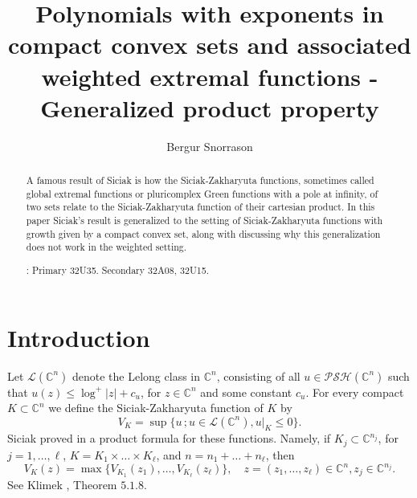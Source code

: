 \documentclass[a4paper,12pt,leqno,english]{article}
\title{{\Large \bf 
Polynomials with exponents in  compact convex sets  and 
associated weighted extremal functions -  \\
Generalized product property}}
\author{Bergur Snorrason}
\date{}
\numberwithin{equation}{section}
\begin{document}
\maketitle

\begin{abstract}
\noindent
A famous result of Siciak is how the Siciak-Zakharyuta functions,
    sometimes called global extremal functions or pluricomplex Green functions with a pole at infinity,
    of two sets relate to the Siciak-Zakharyuta function of their cartesian product.
In this paper Siciak's result is generalized to the setting of Siciak-Zakharyuta functions with growth given by a compact convex set,
    along with discussing why this generalization does not work in the weighted setting.

\medskip\par
{}: Primary 32U35. Secondary 32A08, 32U15.  
\end{abstract}




\section{Introduction}
Let $\mathcal{L}(\mathbb{C}^n)$ denote the Lelong class in $\mathbb{C}^n$, consisting of all $u \in \mathcal{PSH}(\mathbb{C}^n)$ such that
    $u(z) \leq \log^+|z| + c_u$, for $z \in \mathbb{C}^n$ and some constant $c_u$.
For every compact $K \subset \mathbb{C}^n$ we define the Siciak-Zakharyuta function of $K$ by
\begin{equation*}
    V_K
    =
    \sup\{u \,; u \in \mathcal{L}(\mathbb{C}^n), u|_K \leq 0\}.
\end{equation*}
Siciak proved in \cite{Sic:1981} a product formula for these functions.
Namely, if $K_j \subset \mathbb{C}^{n_j}$, for $j = 1, \dots, \ell$, $K = K_1 \times \dots \times K_\ell$, and $n = n_1 + \dots + n_\ell$, then
\begin{equation*}
    V_K(z)
    =
    \max\{V_{K_1}(z_1), \dots, V_{K_\ell}(z_\ell)\},
    \quad
    z = (z_1, \dots, z_\ell) \in \mathbb{C}^n, z_j \in \mathbb{C}^{n_j}.
\end{equation*}
See Klimek \cite{Kli:1991}, Theorem $5.1.8$.
\end{document}
